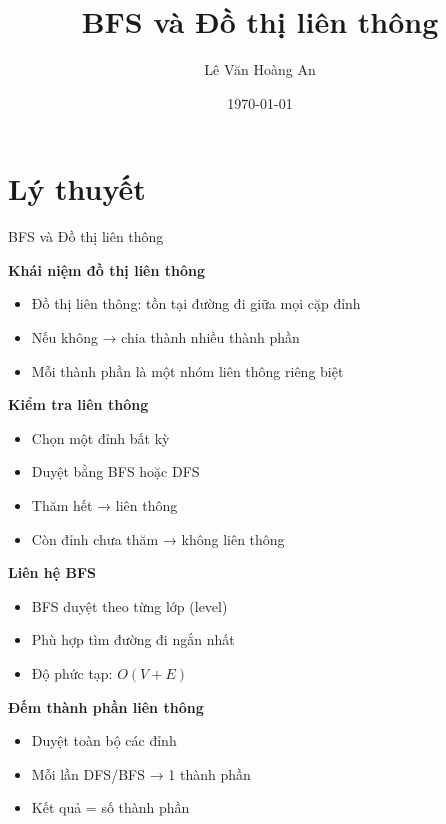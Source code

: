 \documentclass{beamer}
\title{BFS và Đồ thị liên thông}
\author{Lê Văn Hoàng An}
\date{\today}
\begin{document}
\frame{\titlepage}

\section{Lý thuyết}

\begin{frame}{BFS và Đồ thị liên thông}
\begin{tcolorbox}
\textbf{\faProjectDiagram Khái niệm đồ thị liên thông}
\begin{itemize}
\item \faCircle Đồ thị liên thông: tồn tại đường đi giữa mọi cặp đỉnh
\item \faTimesCircle Nếu không → chia thành nhiều thành phần
\item \faSitemap Mỗi thành phần là một nhóm liên thông riêng biệt
\end{itemize}
\end{tcolorbox}

\vspace{0.2cm}

\begin{tcolorbox}
\textbf{\faSearch Kiểm tra liên thông}
\begin{itemize}
\item \faPlay Chọn một đỉnh bất kỳ
\item \faRoute Duyệt bằng BFS hoặc DFS
\item \faCheckCircle Thăm hết → liên thông
\item \faExclamationTriangle Còn đỉnh chưa thăm → không liên thông
\end{itemize}
\end{tcolorbox}

\vspace{0.2cm}

\begin{tcolorbox}
\textbf{\faLayerGroup Liên hệ BFS}
\begin{itemize}
\item \faStream BFS duyệt theo từng lớp (level)
\item \faBolt Phù hợp tìm đường đi ngắn nhất
\item \faClock Độ phức tạp: $O(V + E)$
\end{itemize}
\end{tcolorbox}

\vspace{0.2cm}

\begin{tcolorbox}
\textbf{\faCogs Đếm thành phần liên thông}
\begin{itemize}
\item \faSearch Duyệt toàn bộ các đỉnh
\item \faPlusCircle Mỗi lần DFS/BFS → 1 thành phần
\item \faSortNumericUp Kết quả = số thành phần
\end{itemize}
\end{tcolorbox}
\end{frame}
\end{document}

